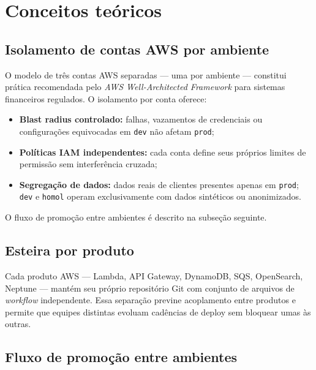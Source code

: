 \section{Conceitos te\'oricos}

\subsection{Isolamento de contas AWS por ambiente}

O modelo de tr\^es contas AWS separadas --- uma por ambiente ---
constitui pr\'atica recomendada pelo \textit{AWS Well-Architected
Framework} para sistemas
financeiros regulados. O isolamento por conta oferece:

\begin{itemize}[leftmargin=*]
  \item \textbf{Blast radius controlado:} falhas, vazamentos de
        credenciais ou configura\c{c}\~oes equivocadas em
        \texttt{dev} n\~ao afetam \texttt{prod};
  \item \textbf{Pol\'iticas IAM independentes:} cada conta
        define seus pr\'oprios limites de permiss\~ao sem interfer\^encia
        cruzada;
  \item \textbf{Segregação de dados:} dados reais de clientes presentes
        apenas em \texttt{prod}; \texttt{dev} e \texttt{homol} operam
        exclusivamente com dados sint\'eticos ou anonimizados.
\end{itemize}

O fluxo de promo\c{c}\~ao entre ambientes \'e descrito na subse\c{c}\~ao seguinte.

\subsection{Esteira por produto}

Cada produto AWS --- Lambda, API Gateway,
DynamoDB, SQS, OpenSearch,
Neptune --- mant\'em seu pr\'oprio reposit\'orio Git
com conjunto de arquivos de \textit{workflow} independente. Essa separação
previne acoplamento entre produtos e permite que equipes distintas evoluam
cadências de deploy sem bloquear umas às outras.

\subsection{Fluxo de promoção entre ambientes}

